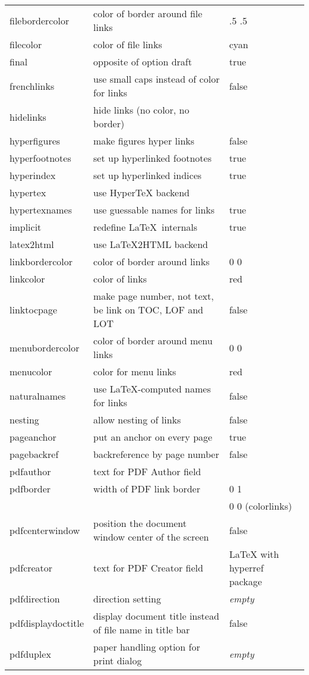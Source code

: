 \documentclass[a4paper,11pt]{article}
\newcommand{\optempty}{{\rmfamily\textit{empty}}}
\newcommand*{\for}[1]{{\rmfamily(#1)}}
\begin{document}
\begin{longtable}{@{}>{\ttfamily}lp{70mm}>{\ttfamily}l@{}}
filebordercolor &color of border around file links& 0 .5 .5\\
filecolor &color of file links&cyan\\
final &opposite of option draft&true\\
frenchlinks &use small caps instead of color for links&false\\
hidelinks&hide links (no color, no border)&\\
hyperfigures &make figures hyper links&false\\
hyperfootnotes &set up hyperlinked footnotes&true\\
hyperindex &set up hyperlinked indices&true\\
hypertex &use HyperTeX backend\\
hypertexnames &use guessable names for links&true\\
implicit &redefine \LaTeX\ internals&true\\
latex2html &use \LaTeX2HTML backend\\
linkbordercolor &color of border around links& 1 0 0\\
linkcolor &color of links&red\\
linktocpage &make page number, not text, be link on TOC, LOF and LOT&false\\
menubordercolor &color of border around menu links& 1 0 0\\
menucolor &color for menu links&red\\
naturalnames &use \LaTeX-computed names for links&false\\
nesting &allow nesting of links&false\\
pageanchor &put an anchor on every page&true\\
pagebackref &backreference by page number&false\\
pdfauthor &text for PDF Author field&\optempty\\
pdfborder &width of PDF link border&0 0 1\\
&&0 0 0 \for{colorlinks}\\
pdfcenterwindow &position the document window center of the screen&false\\
pdfcreator &text for PDF Creator field&LaTeX with hyperref package\\
pdfdirection & direction setting & \optempty\\
pdfdisplaydoctitle &display document title instead of file name in title bar&false\\
pdfduplex &paper handling option for print dialog& \optempty\\

\end{longtable}
\end{document}
